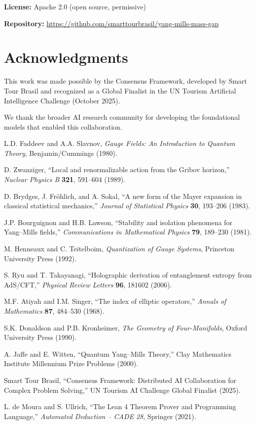 \documentclass[11pt]{article}
\theoremstyle{definition}
\theoremstyle{remark}
\begin{document}
\textbf{License:} Apache 2.0 (open source, permissive)

\textbf{Repository:} \url{https://github.com/smarttourbrasil/yang-mills-mass-gap}

\section*{Acknowledgments}

This work was made possible by the Consensus Framework, developed by Smart Tour Brasil and recognized as a Global Finalist in the UN Tourism Artificial Intelligence Challenge (October 2025).

We thank the broader AI research community for developing the foundational models that enabled this collaboration.

\begin{thebibliography}{99}

L.D. Faddeev and A.A. Slavnov, \textit{Gauge Fields: An Introduction to Quantum Theory}, Benjamin/Cummings (1980).

D. Zwanziger, ``Local and renormalizable action from the Gribov horizon,'' \textit{Nuclear Physics B} \textbf{321}, 591--604 (1989).

D. Brydges, J. Fr\"ohlich, and A. Sokal, ``A new form of the Mayer expansion in classical statistical mechanics,'' \textit{Journal of Statistical Physics} \textbf{30}, 193--206 (1983).

J.P. Bourguignon and H.B. Lawson, ``Stability and isolation phenomena for Yang--Mills fields,'' \textit{Communications in Mathematical Physics} \textbf{79}, 189--230 (1981).

M. Henneaux and C. Teitelboim, \textit{Quantization of Gauge Systems}, Princeton University Press (1992).

S. Ryu and T. Takayanagi, ``Holographic derivation of entanglement entropy from AdS/CFT,'' \textit{Physical Review Letters} \textbf{96}, 181602 (2006).

M.F. Atiyah and I.M. Singer, ``The index of elliptic operators,'' \textit{Annals of Mathematics} \textbf{87}, 484--530 (1968).

S.K. Donaldson and P.B. Kronheimer, \textit{The Geometry of Four-Manifolds}, Oxford University Press (1990).

A. Jaffe and E. Witten, ``Quantum Yang--Mills Theory,'' Clay Mathematics Institute Millennium Prize Problems (2000).

Smart Tour Brasil, ``Consensus Framework: Distributed AI Collaboration for Complex Problem Solving,'' UN Tourism AI Challenge Global Finalist (2025).

L. de Moura and S. Ullrich, ``The Lean 4 Theorem Prover and Programming Language,'' \textit{Automated Deduction -- CADE 28}, Springer (2021).

\end{thebibliography}
\end{document}
